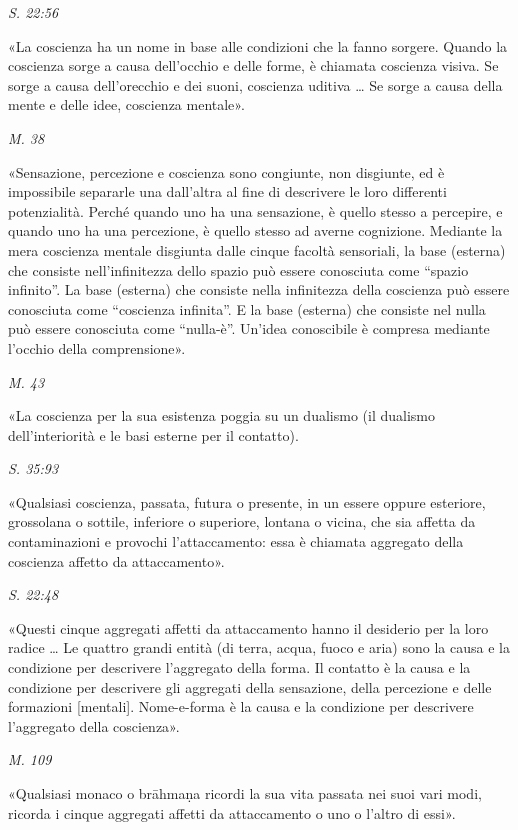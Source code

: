 \emph{S. 22:56}


«La coscienza ha un nome in base alle condizioni che la fanno sorgere.
Quando la coscienza sorge a causa dell’occhio e delle forme, è chiamata
coscienza visiva. Se sorge a causa dell’orecchio e dei suoni, coscienza
uditiva …​ Se sorge a causa della mente e delle idee, coscienza
mentale».


\emph{M. 38}


«Sensazione, percezione e coscienza sono congiunte, non disgiunte, ed è
impossibile separarle una dall’altra al fine di descrivere le loro
differenti potenzialità. Perché quando uno ha una sensazione, è quello
stesso a percepire, e quando uno ha una percezione, è quello stesso ad
averne cognizione. Mediante la mera coscienza mentale disgiunta dalle
cinque facoltà sensoriali, la base (esterna) che consiste
nell’infinitezza dello spazio può essere conosciuta come “spazio
infinito”. La base (esterna) che consiste nella infinitezza della
coscienza può essere conosciuta come “coscienza infinita”. E la base
(esterna) che consiste nel nulla può essere conosciuta come “nulla-è”.
Un’idea conoscibile è compresa mediante l’occhio della comprensione».


\emph{M. 43}


«La coscienza per la sua esistenza poggia su un dualismo (il dualismo
dell’interiorità e le basi esterne per il contatto).


\emph{S. 35:93}


«Qualsiasi coscienza, passata, futura o presente, in un essere oppure
esteriore, grossolana o sottile, inferiore o superiore, lontana o
vicina, che sia affetta da contaminazioni e provochi l’attaccamento:
essa è chiamata aggregato della coscienza affetto da attaccamento».


\emph{S. 22:48}


«Questi cinque aggregati affetti da attaccamento hanno il desiderio per
la loro radice …​ Le quattro grandi entità (di terra, acqua, fuoco e
aria) sono la causa e la condizione per descrivere l’aggregato della
forma. Il contatto è la causa e la condizione per descrivere gli
aggregati della sensazione, della percezione e delle formazioni
[mentali]. Nome-e-forma è la causa e la condizione per descrivere
l’aggregato della coscienza».


\emph{M. 109}


«Qualsiasi monaco o brāhmaṇa ricordi la sua vita passata nei suoi vari
modi, ricorda i cinque aggregati affetti da attaccamento o uno o l’altro
di essi».


